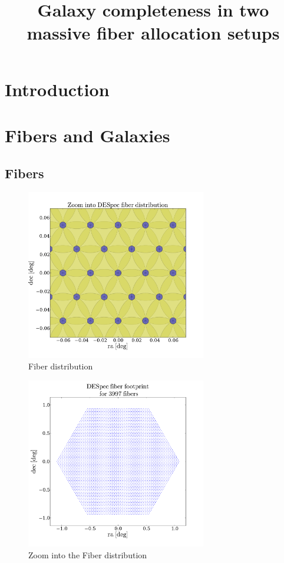 \documentclass{article}
\title{Galaxy completeness in two massive fiber allocation setups}
\begin{document}
\maketitle
\section{Introduction}

\section{Fibers and Galaxies}

\subsection{Fibers}

\begin{figure}
\begin{center}
\includegraphics[keepaspectratio=true,width=0.7\textwidth]{DES_fibers_zoom.pdf}
\caption{Fiber distribution}
\end{center}
\end{figure}

\begin{figure}
\begin{center}
\includegraphics[keepaspectratio=true,width=0.7\textwidth]{DES_fibers.pdf}
\caption{Zoom into the Fiber distribution}
\end{center}
\end{figure}
\end{document}
